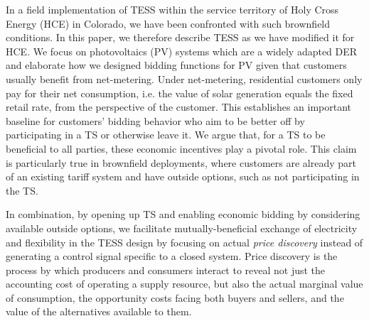 In a field implementation of TESS within the service territory of Holy Cross Energy (HCE) in Colorado, we have been confronted with such brownfield conditions.
In this paper, we therefore describe TESS as we have modified it for HCE. We focus on photovoltaics (PV) systems which are a widely adapted DER and elaborate how we designed bidding functions for PV given that customers usually benefit from net-metering. Under net-metering, residential customers only pay for their net consumption, i.e. the value of solar generation equals the fixed retail rate, from the perspective of the customer.
This establishes an important baseline for customers' bidding behavior who aim to be better off by participating in a TS or otherwise leave it.
We argue that, for a TS to be beneficial to all parties, these economic incentives play a pivotal role. This claim is particularly true in brownfield deployments, where customers are already part of an existing tariff system and have outside options, such as not participating in the TS.

In combination, by opening up TS and enabling economic bidding by considering available outside options, we facilitate mutually-beneficial exchange of electricity and flexibility in the TESS design by focusing on actual \emph{price discovery} instead of generating a control signal specific to a closed system. Price discovery is the process by which producers and consumers interact to reveal not just the accounting cost of operating a supply resource, but also the actual marginal value of consumption, the opportunity costs facing both buyers and sellers, and the value of the alternatives available to them. %


